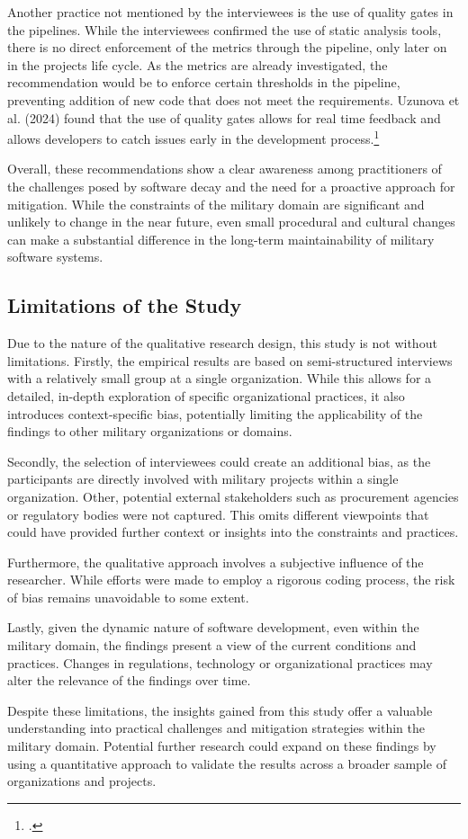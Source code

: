 Another practice not mentioned by the interviewees is the use of quality gates in the pipelines. While the interviewees confirmed the use of static analysis tools, there is no direct enforcement of the metrics through the pipeline, only later on in the projects life cycle.
As the metrics are already investigated, the recommendation would be to enforce certain thresholds in the pipeline, preventing addition of new code that does not meet the requirements. Uzunova et al. (2024) found that the use of quality gates allows for real time feedback and allows developers to catch issues early in the development process.\footcite[8]{uzunovaQualityGatesSoftware2024}

Overall, these recommendations show a clear awareness among practitioners of the challenges posed by software decay and the need for a proactive approach for mitigation. While the constraints of the military domain are significant and unlikely to change in the near future, even small procedural and 
cultural changes can make a substantial difference in the long-term maintainability of military software systems.

\subsection{Limitations of the Study}
Due to the nature of the qualitative research design, this study is not without limitations. Firstly, the empirical results are based on semi-structured interviews with a relatively small group at a single organization.
While this allows for a detailed, in-depth exploration of specific organizational practices, it also introduces context-specific bias, potentially limiting the applicability of the findings to other military organizations or domains.

Secondly, the selection of interviewees could create an additional bias, as the participants are directly involved with military projects within a single organization. Other, potential external stakeholders such as procurement agencies
or regulatory bodies were not captured. This omits different viewpoints that could have provided further context or insights into the constraints and practices.

Furthermore, the qualitative approach involves a subjective influence of the researcher. While efforts were made to employ a rigorous coding process, the risk of bias remains unavoidable to some extent.

Lastly, given the dynamic nature of software development, even within the military domain, the findings present a view of the current conditions and practices. Changes in regulations, technology or organizational practices may alter the relevance of the findings over time.

Despite these limitations, the insights gained from this study offer a valuable understanding into practical challenges and mitigation strategies within the military domain. Potential further research could expand on these findings by using a quantitative approach to validate the results across a broader sample of organizations and projects.
